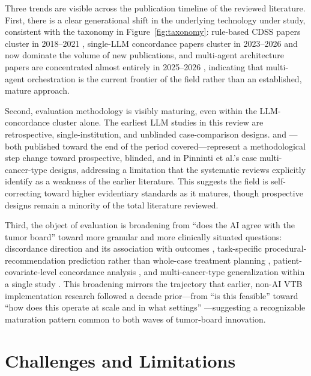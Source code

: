 \documentclass[acmsmall,screen=true,review=false,nonacm=true]{acmart}
\begin{document}
Three trends are visible across the publication timeline of the reviewed literature. First, there is a clear generational shift in the underlying technology under study, consistent with the taxonomy in Figure~\ref{fig:taxonomy}: rule-based CDSS papers cluster in 2018--2021 \citep{somashekhar2018,jie2021}, single-LLM concordance papers cluster in 2023--2026 and now dominate the volume of new publications, and multi-agent architecture papers are concentrated almost entirely in 2025--2026 \citep{liu2026,han2025,saenz2026,wang2025jco}, indicating that multi-agent orchestration is the current frontier of the field rather than an established, mature approach.

Second, evaluation methodology is visibly maturing, even within the LLM-concordance cluster alone. The earliest LLM studies in this review are retrospective, single-institution, and unblinded case-comparison designs. \citet{pinninti2026} and \citet{seshachalam2026}---both published toward the end of the period covered---represent a methodological step change toward prospective, blinded, and in Pinninti et al.'s case multi-cancer-type designs, addressing a limitation that the systematic reviews \citep{carl2024,wu2026} explicitly identify as a weakness of the earlier literature. This suggests the field is self-correcting toward higher evidentiary standards as it matures, though prospective designs remain a minority of the total literature reviewed.

Third, the object of evaluation is broadening from ``does the AI agree with the tumor board'' toward more granular and more clinically situated questions: discordance direction and its association with outcomes \citep{aliyev2026}, task-specific procedural-recommendation prediction rather than whole-case treatment planning \citep{aubreville2024}, patient-covariate-level concordance analysis \citep{park2023}, and multi-cancer-type generalization within a single study \citep{liu2026,pinninti2026}. This broadening mirrors the trajectory that earlier, non-AI VTB implementation research followed a decade prior---from ``is this feasible'' \citep{marshall2014} toward ``how does this operate at scale and in what settings'' \citep{thiagarajan2023}---suggesting a recognizable maturation pattern common to both waves of tumor-board innovation.

\section{Challenges and Limitations}
\label{sec:challenges}
\end{document}
